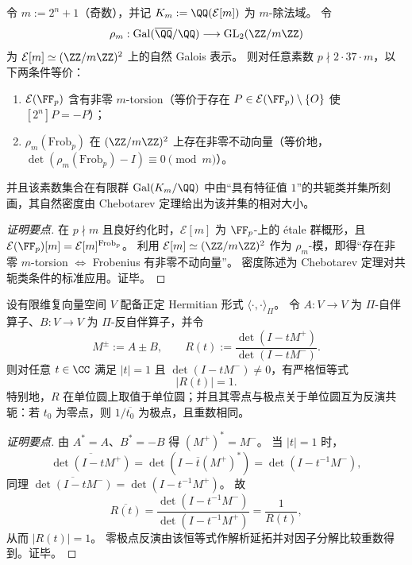 \begin{conclusion}[除法域的 Chebotarev 刻画：\texorpdfstring{$m=2^{n}+1$}{m=2^n+1} 时 \texorpdfstring{$(-1)$}{-1}-holonomy 与 Frobenius 不动向量]\label{con:xi-terminal-zm-lattes-minus-holonomy-division-field-chebotarev}
令 \(m:=2^{n}+1\)（奇数），并记 \(K_m:=\QQ(\mathcal{E}[m])\) 为 \(m\)-除法域。
令
\[
\rho_m:\mathrm{Gal}(\overline{\QQ}/\QQ)\longrightarrow \mathrm{GL}_2(\ZZ/m\ZZ)
\]
为 \(\mathcal{E}[m]\simeq(\ZZ/m\ZZ)^2\) 上的自然 Galois 表示。
则对任意素数 \(p\nmid 2\cdot 37\cdot m\)，以下两条件等价：
\begin{enumerate}
  \item \(\mathcal{E}(\FF_p)\) 含有非零 \(m\)-torsion（等价于存在 \(P\in\mathcal{E}(\FF_p)\setminus\{O\}\) 使 \([2^{n}]P=-P\)）；
  \item \(\rho_m(\mathrm{Frob}_p)\) 在 \((\ZZ/m\ZZ)^2\) 上存在非零不动向量（等价地，\(\det(\rho_m(\mathrm{Frob}_p)-I)\equiv 0\pmod m\)）。
\end{enumerate}
并且该素数集合在有限群 \(\mathrm{Gal}(K_m/\QQ)\) 中由“具有特征值 \(1\)”的共轭类并集所刻画，其自然密度由 Chebotarev 定理给出为该并集的相对大小。
\end{conclusion}
\begin{proof}[证明要点]
在 \(p\nmid m\) 且良好约化时，\(\mathcal{E}[m]\) 为 \(\FF_p\)-上的 \'{e}tale 群概形，且
\(\mathcal{E}(\FF_p)[m]=\mathcal{E}[m]^{\mathrm{Frob}_p}\)。
利用 \(\mathcal{E}[m]\simeq(\ZZ/m\ZZ)^2\) 作为 \(\rho_m\)-模，即得“存在非零 \(m\)-torsion \(\Leftrightarrow\) Frobenius 有非零不动向量”。
密度陈述为 Chebotarev 定理对共轭类条件的标准应用。证毕。
\end{proof}

\begin{conclusion}[Lee--Yang 型行列式比值的单位圆模守恒：\texorpdfstring{$(A^*=A,\ B^*=-B)\Rightarrow |R(e^{i\theta})|=1$}{unit-circle modulus}]\label{con:xi-terminal-zm-leyang-unit-circle-determinant-ratio}
设有限维复向量空间 \(V\) 配备正定 Hermitian 形式 \(\langle\cdot,\cdot\rangle_{\Pi}\)。
令 \(A:V\to V\) 为 \(\Pi\)-自伴算子、\(B:V\to V\) 为 \(\Pi\)-反自伴算子，并令
\[
M^{\pm}:=A\pm B,\qquad
R(t):=\frac{\det(I-tM^{+})}{\det(I-tM^{-})}.
\]
则对任意 \(t\in\CC\) 满足 \(|t|=1\) 且 \(\det(I-tM^{-})\neq 0\)，有严格恒等式
\[
|R(t)|=1.
\]
特别地，\(R\) 在单位圆上取值于单位圆；并且其零点与极点关于单位圆互为反演共轭：若 \(t_0\) 为零点，则 \(1/\overline{t_0}\) 为极点，且重数相同。
\end{conclusion}
\begin{proof}[证明要点]
由 \(A^*=A\)、\(B^*=-B\) 得 \((M^{+})^*=M^{-}\)。
当 \(|t|=1\) 时，
\[
\overline{\det(I-tM^{+})}
=\det(I-\overline{t}(M^{+})^*)
=\det(I-t^{-1}M^{-}),
\]
同理 \(\overline{\det(I-tM^{-})}=\det(I-t^{-1}M^{+})\)。
故
\[
\overline{R(t)}
=\frac{\det(I-t^{-1}M^{-})}{\det(I-t^{-1}M^{+})}
=\frac{1}{R(t)},
\]
从而 \(|R(t)|=1\)。
零极点反演由该恒等式作解析延拓并对因子分解比较重数得到。证毕。
\end{proof}


